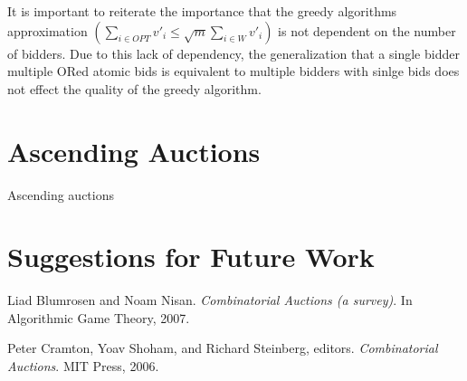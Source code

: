 \documentclass[10pt,onecolumn,letterpaper]{article}
\theoremstyle{definition}
\begin{document}
It is important to reiterate the importance that the greedy algorithms approximation $(\sum_{i \in OPT} v'_i \leq \sqrt{m} \sum_{i \in W} v'_i)$ is not dependent on the number of bidders. Due to this lack of dependency, the generalization that a single bidder multiple ORed atomic bids is equivalent to multiple bidders with sinlge bids does not effect the quality of the greedy algorithm.

\section{Ascending Auctions} %

Ascending auctions 

\section{Suggestions for Future Work} %



\begin{thebibliography}{0} %

Liad Blumrosen and Noam Nisan. 
\textit{Combinatorial Auctions (a survey)}. 
In Algorithmic Game Theory, 2007.
 
Peter Cramton, Yoav Shoham, and Richard Steinberg, editors.
\textit{Combinatorial Auctions}. 
MIT Press, 2006.
 
\end{thebibliography}
\end{document}

